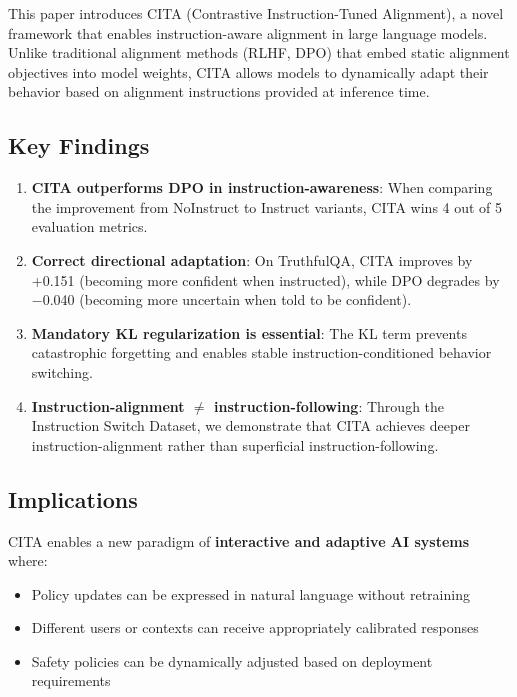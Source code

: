 
\label{sec:conclusion}

This paper introduces CITA (Contrastive Instruction-Tuned Alignment), a novel framework that enables instruction-aware alignment in large language models. Unlike traditional alignment methods (RLHF, DPO) that embed static alignment objectives into model weights, CITA allows models to dynamically adapt their behavior based on alignment instructions provided at inference time.

\subsection{Key Findings}

\begin{enumerate}
    \item \textbf{CITA outperforms DPO in instruction-awareness}: When comparing the improvement from NoInstruct to Instruct variants, CITA wins 4 out of 5 evaluation metrics.

    \item \textbf{Correct directional adaptation}: On TruthfulQA, CITA improves by +0.151 (becoming more confident when instructed), while DPO degrades by $-$0.040 (becoming more uncertain when told to be confident).

    \item \textbf{Mandatory KL regularization is essential}: The KL term prevents catastrophic forgetting and enables stable instruction-conditioned behavior switching.

    \item \textbf{Instruction-alignment $\neq$ instruction-following}: Through the Instruction Switch Dataset, we demonstrate that CITA achieves deeper instruction-alignment rather than superficial instruction-following.
\end{enumerate}

\subsection{Implications}

CITA enables a new paradigm of \textbf{interactive and adaptive AI systems} where:
\begin{itemize}
    \item Policy updates can be expressed in natural language without retraining
    \item Different users or contexts can receive appropriately calibrated responses
    \item Safety policies can be dynamically adjusted based on deployment requirements
\end{itemize}

